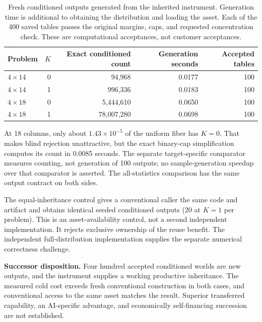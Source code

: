 \begin{table}[htbp]
\centering\small
\begin{tabular}{@{}lrrrr@{}}
\toprule
Problem & $K$ & Exact conditioned count & Generation seconds & Accepted tables\\
\midrule
$4\times 14$ & 0 & 94,968 & 0.0177 & 100 \\
$4\times 14$ & 1 & 996,336 & 0.0183 & 100 \\
$4\times 18$ & 0 & 5,444,610 & 0.0650 & 100 \\
$4\times 18$ & 1 & 78,007,280 & 0.0698 & 100 \\
\bottomrule
\end{tabular}
\caption{Fresh conditioned outputs generated from the inherited instrument.
Generation time is additional to obtaining the distribution and loading the asset.
Each of the 400 saved tables passes the original margins, caps, and requested
concentration check. These are computational acceptances, not customer acceptances.}
\end{table}

At 18 columns, only about $1.43\times10^{-5}$ of the uniform fiber has $K=0$.
That makes blind rejection unattractive, but the exact binary-cap simplification
computes its count in 0.0085 seconds. The separate target-specific comparator
measures counting, not generation of 100 outputs; no sample-generation speedup
over that comparator is asserted. The all-statistics comparison has the same
output contract on both sides.

The equal-inheritance control gives a conventional caller the same code and
artifact and obtains identical seeded conditioned outputs (20 at $K=1$ per
problem). This is an asset-availability control, not a second independent
implementation. It rejects exclusive ownership of the reuse benefit. The
independent full-distribution implementation supplies the separate numerical
correctness challenge.

\begin{evidencebox}
\textbf{Successor disposition.} Four hundred accepted conditioned worlds are
new outputs, and the instrument supplies a working productive inheritance.
The measured cold cost exceeds fresh conventional construction in both cases,
and conventional access to the same asset matches the result. Superior
transferred capability, an AI-specific advantage, and economically self-financing
succession are not established.
\end{evidencebox}

